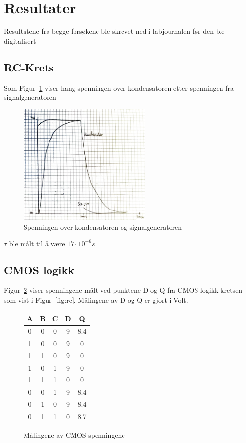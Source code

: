 \section{Resultater}

Resultatene fra begge forsøkene ble skrevet ned i labjournalen før den ble digitalisert

\subsection{RC-Krets}

Som Figur~\ref{fig:rc-resultater} viser hang spenningen over kondensatoren etter spenningen fra signalgeneratoren 

\begin{figure}[!htb]
    \centering
    \includegraphics[height=6cm]{figurer/RC-figur.pdf}
    \caption{Spenningen over kondensatoren og signalgeneratoren}
    \label{fig:rc-resultater}
\end{figure}

$\tau$ ble målt til å være $17\cdot 10^{-6}s$

\subsection{CMOS logikk}

Figur~\ref{fig:cmos-resultater} viser spenningene målt ved punktene D og Q fra CMOS logikk kretsen som vist i Figur~\ref{fig:rc}. Målingene av D og Q er gjort i Volt.

\begin{figure}[!htb]
    \centering
    \begin{tabular}{|c|c|c|c|c|}
        \hline
        \textbf{A} & \textbf{B} & \textbf{C} & \textbf{D} & \textbf{Q} \\ \hline
        0 & 0 & 0 & 9 & 8.4 \\
        1 & 0 & 0 & 9 & 0 \\
        1 & 1 & 0 & 9 & 0 \\
        1 & 0 & 1 & 9 & 0 \\
        1 & 1 & 1 & 0 & 0 \\
        0 & 0 & 1 & 9 & 8.4 \\
        0 & 1 & 0 & 9 & 8.4 \\
        0 & 1 & 1 & 0 & 8.7 \\ \hline
    \end{tabular}
    \caption{Målingene av CMOS spenningene}
    \label{fig:cmos-resultater}
\end{figure}